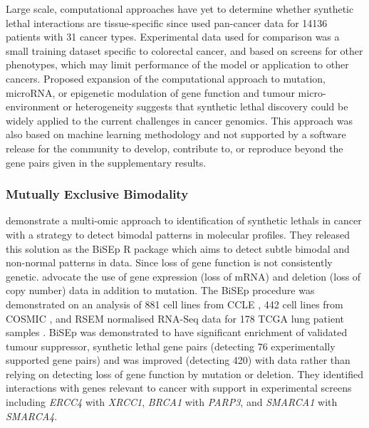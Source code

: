 Large scale, computational approaches have yet to determine whether \gls{synthetic lethal} interactions are tissue-specific since \citet{Lu2015} used pan-cancer data for 14136 patients with 31 cancer types. Experimental data used for comparison was a small training dataset specific to colorectal cancer, and based on screens for other phenotypes, which may limit performance of the model or application to other cancers. Proposed expansion of the computational approach to \gls{mutation}, \gls{microRNA}, or epigenetic modulation of gene function and tumour micro-environment or heterogeneity suggests that \gls{synthetic lethal} discovery could be widely applied to the current challenges in cancer \glspl{genomic}. This approach was also based on machine learning methodology and not supported by a software release for the community to develop, contribute to, or reproduce beyond the gene pairs given in the supplementary results. 

\subsubsection{Mutually Exclusive Bimodality}

\citet{Wappett2016} demonstrate a multi-omic approach to identification of \glspl{synthetic lethal} in cancer with a strategy to detect bimodal patterns in \glspl{molecular profile}. They released this solution as the \gls{BiSEp} R package \citep{Wappett2014} which aims to detect subtle bimodal and non-normal patterns in  data. Since loss of gene function is not consistently genetic. \citet{Wappett2016} advocate the use of \gls{gene expression} (loss of \acrshort{mRNA}) and deletion (loss of copy number) data in addition to \gls{mutation}. The \gls{BiSEp} procedure was demonstrated on an analysis of 881 cell lines from \gls{CCLE} \citep{Barretina2012}, 442 cell lines from \gls{COSMIC} \citep{Forbes2015}, and \gls{RSEM} normalised \gls{RNA-Seq} data for 178 \gls{TCGA} lung patient samples \citep{TCGA2014LU}. \gls{BiSEp} was demonstrated to have significant enrichment of validated \gls{tumour suppressor}, \gls{synthetic lethal} gene pairs (detecting 76 experimentally supported gene pairs) and was improved (detecting 420) with  data rather than relying on detecting loss of gene function by \gls{mutation} or deletion. They identified interactions with genes relevant to cancer with support in experimental screens including \textit{ERCC4} with \textit{XRCC1}, \textit{BRCA1} with \textit{PARP3}, and \textit{SMARCA1} with \textit{SMARCA4}.

